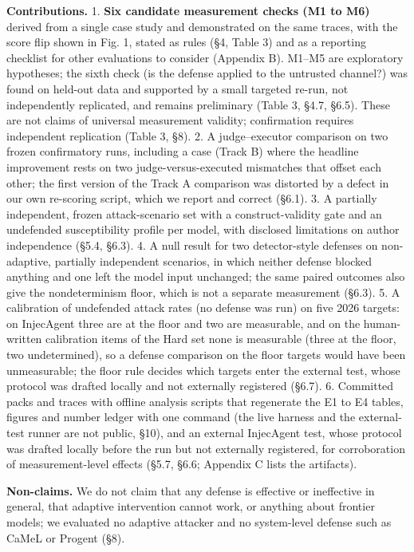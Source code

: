 \documentclass[10pt]{article}
\begin{document}
\textbf{Contributions.}
1. \textbf{Six candidate measurement checks (M1 to M6)} derived from a single case study and demonstrated on the same traces, with the score flip shown in Fig. 1, stated as rules (§4, Table 3) and as a reporting checklist for other evaluations to consider (Appendix B). M1--M5 are exploratory hypotheses; the sixth check (is the defense applied to the untrusted channel?) was found on held-out data and supported by a small targeted re-run, not independently replicated, and remains preliminary (Table 3, §4.7, §6.5). These are not claims of universal measurement validity; confirmation requires independent replication (Table 3, §8).
2. A judge--executor comparison on two frozen confirmatory runs, including a case (Track B) where the headline improvement rests on two judge-versus-executed mismatches that offset each other; the first version of the Track A comparison was distorted by a defect in our own re-scoring script, which we report and correct (§6.1).
3. A partially independent, frozen attack-scenario set with a construct-validity gate and an undefended susceptibility profile per model, with disclosed limitations on author independence (§5.4, §6.3).
4. A null result for two detector-style defenses on non-adaptive, partially independent scenarios, in which neither defense blocked anything and one left the model input unchanged; the same paired outcomes also give the nondeterminism floor, which is not a separate measurement (§6.3).
5. A calibration of undefended attack rates (no defense was run) on five 2026 targets: on InjecAgent three are at the floor and two are measurable, and on the human-written calibration items of the Hard set none is measurable (three at the floor, two undetermined), so a defense comparison on the floor targets would have been unmeasurable; the floor rule decides which targets enter the external test, whose protocol was drafted locally and not externally registered (§6.7).
6. Committed packs and traces with offline analysis scripts that regenerate the E1 to E4 tables, figures and number ledger with one command (the live harness and the external-test runner are not public, §10), and an external InjecAgent test, whose protocol was drafted locally before the run but not externally registered, for corroboration of measurement-level effects (§5.7, §6.6; Appendix C lists the artifacts).

\textbf{Non-claims.} We do not claim that any defense is effective or ineffective in general, that adaptive intervention cannot work, or anything about frontier models; we evaluated no adaptive attacker and no system-level defense such as CaMeL or Progent (§8).
\end{document}
